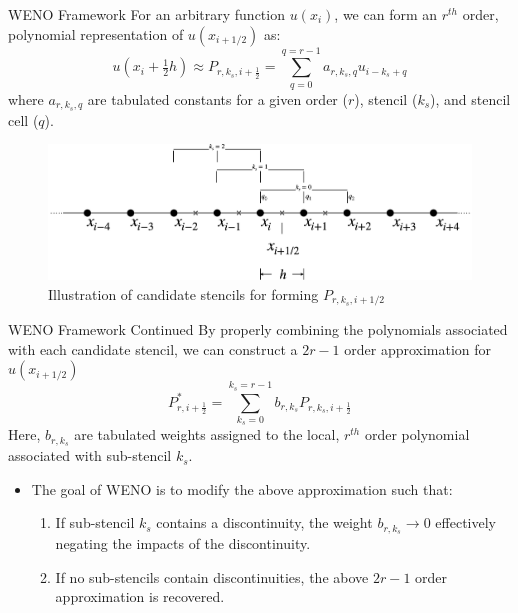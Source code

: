 \documentclass[9pt]{beamer}
\begin{document}
\begin{frame}{WENO Framework}
  For an arbitrary function $u(x_i)$, we can form an $r^{th}$ order, polynomial representation of $u(x_{i+1/2})$ as:
  \begin{equation}
    u(x_i+\tfrac{1}{2}h) \approx P_{r,k_s,i+\frac{1}{2}}= \sum_{q=0}^{q=r-1}a_{r,k_s,q}u_{i-k_s+q}\label{eq:PolynomialReconstruction}
  \end{equation}
  where $a_{r,k_s,q}$ are tabulated constants for a given order ($r$), stencil ($k_s$), and stencil cell ($q$).
  \begin{figure}[H]
    \centering
    \includegraphics[scale=0.165]{StencilReconstruct.png}\caption{Illustration of candidate stencils for forming $P_{r,k_s,i+1/2}$}
      \label{fig: Stencil Graphic}
  \end{figure}
\end{frame}

\begin{frame}{WENO Framework Continued}
  By properly combining the polynomials associated with each candidate stencil, we can construct a $2r-1$ order approximation for $u(x_{i+1/2})$
  \begin{equation}
    P^{*}_{r,i+\frac{1}{2}} = \sum_{k_s=0}^{k_s=r-1}b_{r,k_s}P_{r,k_s,i+\frac{1}{2}}\label{eq: Optimal Reconstruction Definition}
  \end{equation}
  Here, $b_{r,k_s}$ are tabulated weights assigned to the local, $r^{th}$ order polynomial associated with sub-stencil $k_s$.
  
  \begin{itemize}
    \item The goal of WENO is to modify the above approximation such that:
    \begin{enumerate}
      \item If sub-stencil $k_s$ contains a discontinuity, the weight $b_{r,k_s} \longrightarrow 0$ effectively negating the impacts of the discontinuity.
      \item If no sub-stencils contain discontinuities, the above $2r-1$ order approximation is recovered.
    \end{enumerate}
  \end{itemize}
\end{frame}
\end{document}
